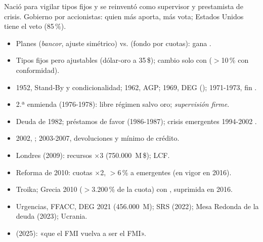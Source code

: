 \documentclass{article}
\begin{document}
\begin{columnas}
\begin{ideaclave}
Nació para vigilar tipos fijos y se reinventó como supervisor y prestamista de crisis. Gobierno por accionistas: quien más aporta, más vota; Estados Unidos tiene el veto (85\,\%).
\end{ideaclave}

\begin{itemize}
\item Planes  (\emph{bancor}, ajuste simétrico) vs.  (fondo por cuotas): gana .
\item Tipos fijos pero ajustables (dólar-oro a 35\,\$); cambio solo con  ($>$10\,\% con conformidad).
\item 1952, Stand-By y condicionalidad; 1962, AGP; 1969, DEG (); 1971-1973, fin .
\end{itemize}
\begin{itemize}
\item 2.ª enmienda (1976-1978): libre régimen salvo oro; \emph{supervisión firme}.
\item Deuda de 1982; préstamos de favor (1986-1987); crisis emergentes 1994-2002 .
\item 2002, ; 2003-2007, devoluciones y mínimo de crédito.
\end{itemize}
\begin{itemize}
\item Londres (2009): recursos $\times$3 (750.000~M\,\$); LCF.
\item Reforma de 2010: cuotas $\times$2, $>$6\,\% a emergentes (en vigor en 2016).
\item Troika; Grecia 2010 ($>$3.200\,\% de la cuota) con , suprimida en 2016.
\end{itemize}
\begin{itemize}
\item Urgencias, FFACC, DEG 2021 (456.000~M); SRS (2022); Mesa Redonda de la deuda (2023); Ucrania.
\item {} (2025): «que el FMI vuelva a ser el FMI».
\end{itemize}


\end{columnas}
\end{document}
